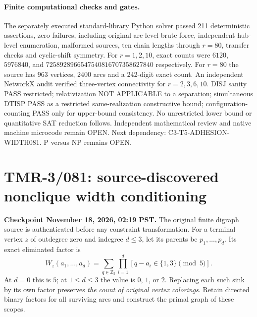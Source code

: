 \documentclass[11pt]{article}
\begin{document}
\paragraph{Finite computational checks and gates.}
The separately executed standard-library Python solver passed
211 deterministic assertions, zero failures, including original
arc-level brute force, independent hub-level enumeration, malformed
sources, ten chain lengths through $r=80$, transfer checks and
cyclic-shift symmetry. For $r=1,2,10$, exact counts were
$6120$, $5976840$, and
$7258928966547540816707358627840$ respectively.
For $r=80$ the source has 963 vertices, 2400 arcs and a
242-digit exact count. An independent NetworkX audit verified
three-vertex connectivity for $r=2,3,6,10$.
DISJ sanity PASS restricted; relativization NOT APPLICABLE
to a separation; simultaneous DTISP PASS as a restricted
same-realization constructive bound; configuration-counting
PASS only for upper-bound consistency. No unrestricted lower
bound or quantitative SAT reduction follows. Independent
mathematical review and native machine microcode remain OPEN.
Next dependency: \textsc{C3-T5-ADHESION-WIDTH081}.
P versus NP remains OPEN.


\section{TMR-3/081: source-discovered nonclique width conditioning}
\noindent\textbf{Checkpoint November 18, 2026, 02:19 PST.}
The original finite digraph source is authenticated before any
constraint transformation. For a terminal vertex $z$ of outdegree
zero and indegree $d\le 3$, let its parents be $p_1,\ldots,p_d$.
Its exact eliminated factor is
\[
W_z(a_1,\ldots,a_d)=
\sum_{q\in\mathbb Z_5}
\prod_{i=1}^d[q-a_i\in\{1,3\}\pmod5].
\]
At $d=0$ this is $5$; at $1\le d\le3$ the value is
$0$, $1$, or $2$. Replacing each such sink by its own factor
preserves \emph{the count of original vertex colorings}.
Retain directed binary factors for all surviving arcs and
construct the primal graph of these scopes.
\end{document}
